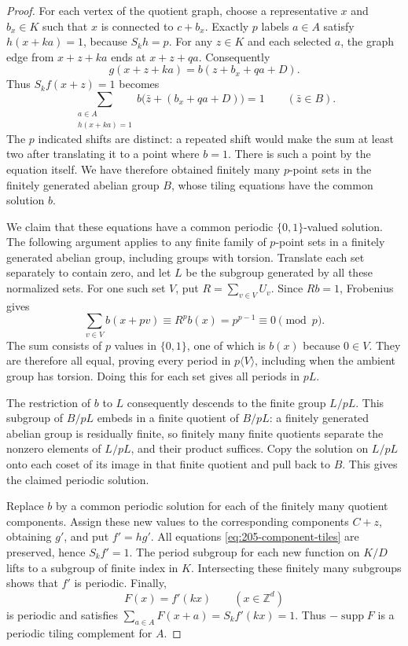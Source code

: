 \documentclass[11pt,reqno]{amsart}
\newcommand{\Z}{\mathbb Z}
\newcommand{\supp}{\operatorname{supp}}
\theoremstyle{definition}
\theoremstyle{remark}
\numberwithin{equation}{section}
\begin{document}
\begin{proof}
For each vertex of the quotient graph, choose a representative $x$
and $b_x\in K$ such that $x$ is connected to $c+b_x$.
Exactly $p$ labels $a\in A$ satisfy $h(x+ka)=1$, because $S_kh=p$.
For any $z\in K$ and each selected $a$, the graph edge from
$x+z+ka$ ends at $x+z+qa$. Consequently
\[
 g(x+z+ka)=b(z+b_x+qa+D).
\]
Thus $S_kf(x+z)=1$ becomes
\begin{equation}\label{eq:205-component-tiles}
 \sum_{\substack{a\in A\\h(x+ka)=1}}
 b\bigl(\bar z+(b_x+qa+D)\bigr)=1\qquad(\bar z\in B).
\end{equation}
The $p$ indicated shifts are distinct: a repeated shift would make
the sum at least two after translating it to a point where $b=1$.
There is such a point by the equation itself. We have therefore
obtained finitely many $p$-point sets in the finitely generated
abelian group $B$, whose tiling equations have the common solution $b$.

We claim that these equations have a common periodic $\{0,1\}$-valued
solution. The following argument applies to any finite family of
$p$-point sets in a finitely generated abelian group, including groups
with torsion. Translate each set separately to contain zero, and let
$L$ be the subgroup generated by all these normalized sets. For one
such set $V$, put $R=\sum_{v\in V}U_v$. Since $Rb=1$,
Frobenius gives
\[
 \sum_{v\in V} b(x+pv)\equiv R^p b(x)=p^{p-1}
 \equiv0\pmod p.
\]
The sum consists of $p$ values in $\{0,1\}$, one of which is $b(x)$ because
$0\in V$. They are therefore all equal, proving every period
in $p\langle V\rangle$, including when the ambient group has torsion.
Doing this for each set gives all periods in $pL$.

The restriction of $b$ to $L$ consequently descends to the finite
group $L/pL$. This subgroup of $B/pL$ embeds in a finite quotient
of $B/pL$: a finitely generated abelian group is residually finite,
so finitely many finite quotients separate the nonzero elements of
$L/pL$, and their product suffices. Copy the solution on $L/pL$
onto each coset of its image in that finite quotient and pull back
to $B$. This gives the claimed periodic solution.

Replace $b$ by a common periodic solution for each of the finitely
many quotient components. Assign these new values to the corresponding
components $C+z$, obtaining $g'$, and put $f'=hg'$. All equations
\eqref{eq:205-component-tiles} are preserved, hence $S_kf'=1$.
The period subgroup for each new function on $K/D$ lifts to a subgroup
of finite index in $K$. Intersecting these finitely many subgroups
shows that $f'$ is periodic. Finally,
\[
 F(x)=f'(kx)\qquad(x\in\Z^d)
\]
is periodic and satisfies
$\sum_{a\in A}F(x+a)=S_kf'(kx)=1$. Thus $-\supp F$ is a periodic
tiling complement for $A$.
\end{proof}
\end{document}
